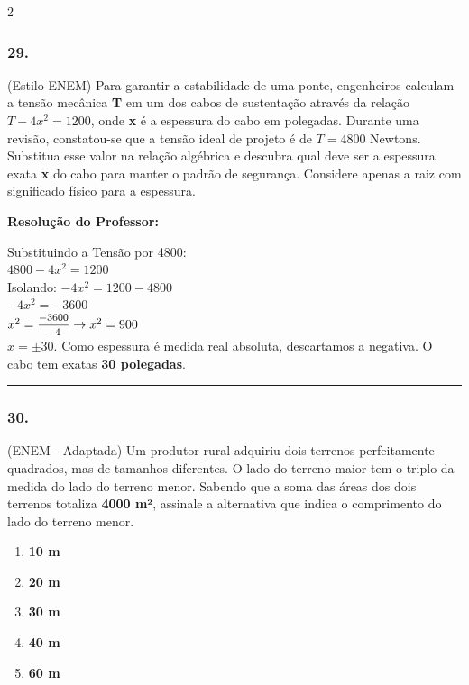 \begin{multicols*}{2}
\subsubsection*{29.} (Estilo ENEM) Para garantir a estabilidade de uma ponte, engenheiros calculam a tensão mecânica \textbf{T} em um dos cabos de sustentação através da relação $ T - 4x^2 = 1200 $, onde \textbf{x} é a espessura do cabo em polegadas. Durante uma revisão, constatou-se que a tensão ideal de projeto é de $ T = 4800 $ Newtons. Substitua esse valor na relação algébrica e descubra qual deve ser a espessura exata \textbf{x} do cabo para manter o padrão de segurança. Considere apenas a raiz com significado físico para a espessura.

\ifgabarito
    \begin{tcolorbox}[colback=CorTitUm!5, colframe=CorTitUm, boxrule=1pt, arc=4pt, left=6pt, right=6pt, top=6pt, bottom=6pt]
    \small\textbf{\textcolor{CorTitUm}{Resolução do Professor:}}\par\vspace{0.1cm}
    \color{CinzaEscuro}
    Substituindo a Tensão por 4800:\\
    $4800 - 4x^2 = 1200$\\
    Isolando: $-4x^2 = 1200 - 4800$\\
    $-4x^2 = -3600$\\
    $x^2 = \mfrac{-3600}{-4} \rightarrow x^2 = 900$\\
    $x = \pm 30$. Como espessura é medida real absoluta, descartamos a negativa. O cabo tem exatas \textbf{30 polegadas}.
    \end{tcolorbox}
\fi

\par\vspace{\espacoQuestao}

\noindent\textcolor{CorLinha}{\rule{\linewidth}{0.5pt}} 
\par\vspace{\espacoPreQuestao}
\subsubsection*{30.} (ENEM - Adaptada) Um produtor rural adquiriu dois terrenos perfeitamente quadrados, mas de tamanhos diferentes. O lado do terreno maior tem o triplo da medida do lado do terreno menor. Sabendo que a soma das áreas dos dois terrenos totaliza \textbf{4000 m²}, assinale a alternativa que indica o comprimento do lado do terreno menor.
\begin{enumerate}[label=\alph*), itemsep=\espacoAlt]
    \item \textbf{10 m}
    \item \textbf{20 m}
    \item \textbf{30 m}
    \item \textbf{40 m}
    \item \textbf{60 m}
\end{enumerate}


\end{multicols*}
